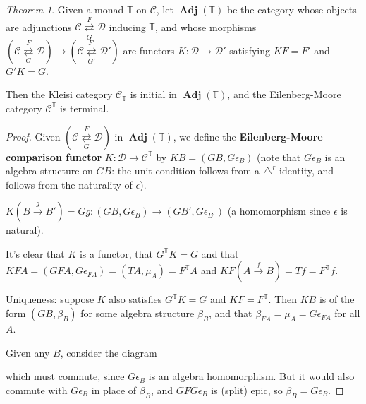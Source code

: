 \documentclass[a4paper]{article}
\theoremstyle{definition}
\theoremstyle{remark}
\theoremstyle{default}
\newtheorem{theorem}[definition]{Theorem}
\numberwithin{definition}{section}
\newcommand*\circbox[1]{\raisebox{.5pt}{\textcircled{\raisebox{-.9pt} {#1}}}}
\DeclareMathOperator{\Adj}{\textbf{Adj}}
\begin{document}
\begin{theorem}
	Given a monad $\mathbb{T}$ on $\mathcal{C}$,
	let $\Adj(\mathbb{T})$ be the category whose objects are adjunctions $\mathcal{C}\underset{G}{\overset{F}{\rightleftarrows}} \mathcal{D}$ inducing $\mathbb{T}$,
	and whose morphisms $(\mathcal{C}\underset{G}{\overset{F}{\rightleftarrows}} \mathcal{D}) \to (\mathcal{C}\underset{G'}{\overset{F'}{\rightleftarrows}} \mathcal{D}')$
	are functors $K: \mathcal{D} \to \mathcal{D}'$ satisfying $KF=F'$ and $G'K=G$.
	
	Then the Kleisi category $\mathcal{C}_\mathbb{T}$ is initial in $\Adj(\mathbb{T})$,
	and the Eilenberg-Moore category $\mathcal{C}^\mathbb{T}$ is terminal.
\end{theorem}
\begin{proof}
	Given $(\mathcal{C}\underset{G}{\overset{F}{\rightleftarrows}} \mathcal{D})$ in $\Adj(\mathbb{T})$,
	we define the \textbf{Eilenberg-Moore comparison functor} $K: \mathcal{D} \to \mathcal{C}^\mathbb{T}$
	by $KB=(GB, G\epsilon_B)$
	(note that $G\epsilon_B$ is an algebra structure on $GB$:
	the unit condition \circbox{4} follows from a $\triangle^r$ identity,
	and \circbox{5} follows from the naturality of $\epsilon$).
	
	$K(B \overset{g}{\to} B') = Gg: (GB, G\epsilon_B) \to (GB', G\epsilon_{B'})$
	(a homomorphism since $\epsilon$ is natural).
	
	It's clear that $K$ is a functor,
	that $G^\mathbb{T}K=G$ and that $KFA = (GFA, G\epsilon_{FA}) = (TA, \mu_A) = F^\mathbb{T}A$ and $KF(A \overset{f}{\to} B) = Tf = F^\mathbb{T}f$.
	
	Uniqueness: suppose $\bar{K}$ also satisfies $G^\mathbb{T}\bar{K} = G$ and $\bar{K}F = F^\mathbb{T}$.
	Then $\bar{K}B$ is of the form $(GB, \beta_B)$ for some algebra structure $\beta_B$,
	and that $\beta_{FA} = \mu_A = G\epsilon_{FA}$ for all $A$.
	
	Given any $B$, consider the diagram
	\begin{center}
	\end{center}
	which must commute, since $G\epsilon_B$ is an algebra homomorphism.
	But it would also commute with $G\epsilon_B$ in place of $\beta_B$,
	and $GFG\epsilon_B$ is (split) epic,
	so $\beta_B = G\epsilon_B$.
	

\end{proof}
\end{document}
